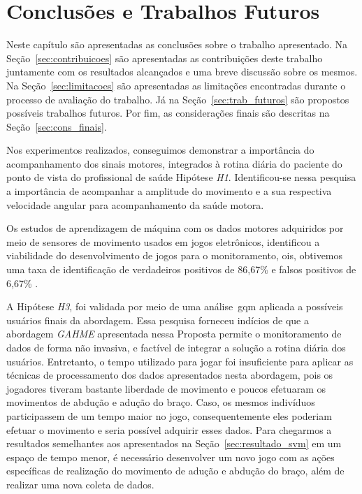 \chapter{Conclusões e Trabalhos Futuros}\label{chapter:conclusoes_futuros}
Neste capítulo são apresentadas as conclusões sobre o trabalho apresentado. Na Seção~\ref{sec:contribuicoes} são apresentadas as contribuições deste trabalho juntamente com os resultados alcançados e uma breve discussão sobre os mesmos. Na Seção~\ref{sec:limitacoes} são apresentadas as limitações encontradas durante o processo de avaliação do trabalho. Já na Seção~\ref{sec:trab_futuros} são propostos possíveis trabalhos futuros. Por fim, as considerações finais são descritas na Seção~\ref{sec:cons_finais}.



Nos experimentos realizados, conseguimos demonstrar a importância do acompanhamento dos sinais motores, integrados à rotina diária do paciente do ponto de vista do profissional de saúde Hipótese \textit{H1}. Identificou-se nessa pesquisa a importância de acompanhar a amplitude do movimento e a sua respectiva velocidade angular para acompanhamento da saúde motora.

Os estudos de aprendizagem de máquina com os dados motores adquiridos por meio de sensores de movimento usados em jogos eletrônicos, identificou a viabilidade do desenvolvimento de jogos para o monitoramento, ois, obtivemos uma taxa de identificação de verdadeiros positivos de 86,67\% e falsos positivos de 6,67\% .

A Hipótese \textit{H3}, foi validada por meio de uma análise~\ac{gqm} aplicada a possíveis usuários finais da abordagem. Essa pesquisa forneceu indícios de que a abordagem \textit{GAHME} apresentada nessa Proposta permite o monitoramento de dados de forma não invasiva, e factível de integrar a solução a rotina diária dos usuários. Entretanto, o tempo utilizado para jogar foi insuficiente para aplicar as técnicas de processamento dos dados apresentados nesta abordagem, pois os jogadores tiveram bastante liberdade de movimento e poucos efetuaram os movimentos de abdução e adução do braço. Caso, os mesmos indivíduos participassem de um tempo maior no jogo, consequentemente eles poderiam efetuar o movimento e seria possível adquirir esses dados. Para chegarmos a resultados semelhantes aos apresentados na Seção~\ref{sec:resultado_svm} em um espaço de tempo menor, é necessário desenvolver um novo jogo com as ações específicas de realização do movimento de adução e abdução do braço, além de realizar uma nova coleta 
de dados.

